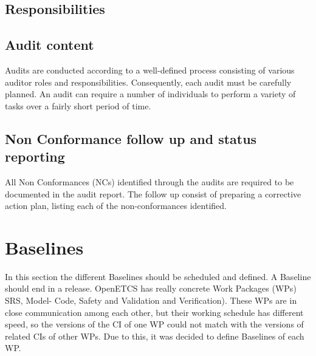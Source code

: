 \documentclass{template/openetcs_article}
\begin{document}
\subsection{Responsibilities} %

\subsection{Audit content} %
Audits are conducted according to a well-defined process consisting of various auditor roles and responsibilities. Consequently,   each audit must be carefully planned. An audit can require a number of individuals to perform a variety of tasks over a fairly  short period of time.

\subsection{Non Conformance follow up and status reporting} %
All Non Conformances (NCs) identified through the audits are required to be documented in the audit report. The follow up  consist of preparing a corrective action plan, listing each of the non-conformances identified.


\section{Baselines} %
In this section the different Baselines should be scheduled and defined. A Baseline should end in a release. OpenETCS has  really concrete Work Packages (WPs) SRS, Model- Code, Safety and Validation and Verification). These WPs are in close  communication among each other, but their working schedule has different speed, so the versions of the CI of one WP could  not match with the versions of related CIs of other WPs. Due to this, it was decided to define Baselines of each WP.
\end{document}
